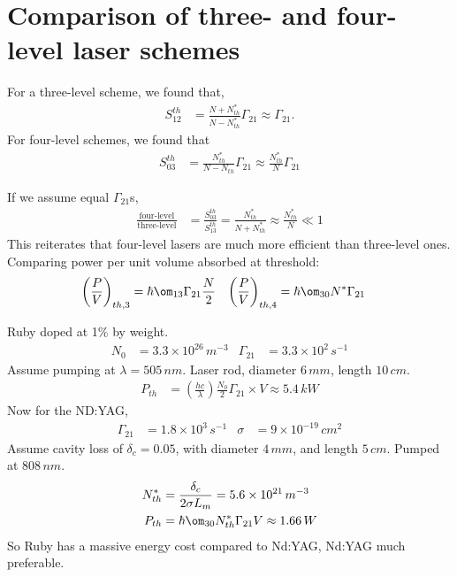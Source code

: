 \documentclass[a4paper, 11pt, normalem]{report}
\begin{document}
\section{Comparison of three- and four-level laser schemes}
\begin{multicols}{2}
For a three-level scheme, we found that,
\begin{align}
    S_{12}^{th} &= \frac{N+N_{th}^*}{N-N_{th}^*}\Gamma_{21} \approx \Gamma_{21}.
\end{align}
For four-level schemes, we found that
\begin{align}
    S_{03}^{th} &= \frac{N_{th}^*}{N-N_{th}}\Gamma_{21} \approx \frac{N_{th}^*}{N}\Gamma_{21}
\end{align}
\end{multicols}
If we assume equal $\Gamma_{21}$s,
\begin{align}
    \frac{\text{four-level}}{\text{three-level}} &= \frac{S_{03}^{th}}{S_{13}^{th}} = \frac{N_{th}^*}{N+N_{th}^*} \approx \frac{N_{th}^*}{N} \ll 1
\end{align}
This reiterates that four-level lasers are much more efficient than three-level ones.
Comparing power per unit volume absorbed at threshold:
\begin{align}
    \left(\frac{P}{V}\right)_{th,3} &= \hbar\om_{13}\Gamma_{21}\frac{N}{2} & \left(\frac{P}{V}\right)_{th,4} &= \hbar\om_{30}N^*\Gamma_{21}
\end{align}

\begin{example}
    Ruby doped at 1\% by weight.
    \begin{align}
        N_0 &= 3.3\times10^{26}\,m^{-3} & \Gamma_{21} &= 3.3\times10^2\,s^{-1}
    \end{align}
    Assume pumping at $\lambda=505\,nm$.
    Laser rod, diameter $6\,mm$, length $10\,cm$.
    \begin{align}
        P_{th} &= \left(\frac{hc}{\lambda}\right)\frac{N_0}{2}\Gamma_{21}\times V \approx 5.4\,kW
    \end{align}
    Now for the ND:YAG,
    \begin{align}
        \Gamma_{21} &= 1.8\times10^3\,s^{-1} & \sigma &= 9\times10^{-19}\,cm^2 
    \end{align}
    Assume cavity loss of $\delta_c = 0.05$, with diameter $4\,mm$, and length $5\,cm$.
    Pumped at $808\,nm$.
    \begin{align}
        N_{th}^* &= \frac{\delta_c}{2\sigma L_m} = 5.6\times10^{21}\,m^{-3} \\
        P_{th} &= \hbar\om_{30}N_{th}^*\Gamma_{21}V \approx 1.66\,W
    \end{align}
    So Ruby has a massive energy cost compared to Nd:YAG, Nd:YAG much preferable.
\end{example}
\end{document}
